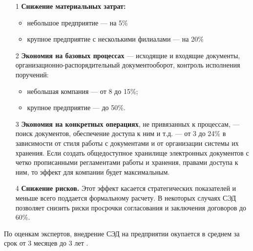 \begin{itemize}
  \item[1] \textbf{Снижение материальных затрат:}
	
	\begin{itemize}
	  \item небольшое предприятие — на 5\%
	  \item крупное предприятие с несколькими филиалами — на 20\%
	\end{itemize}

  \item[2] \textbf{Экономия на базовых процессах} — исходящие и входящие документы, организационно-распорядительный документооборот, контроль исполнения поручений:
	
	\begin{itemize}
	  \item небольшая компания — от 8 до 15\%;
	  \item крупное предприятие — до 50\%.
	\end{itemize}
	
  \item[3] \textbf{Экономия на конкретных операциях}, не привязанных к процессам, — поиск документов, обеспечение доступа к ним и т.д. — от 3 до 24\% в зависимости от стиля работы с документами и от организации системы их хранения. Если создать общедоступное хранилище электронных документов с четко прописанными регламентами работы и хранения, правами доступа к ним, то эффект для компании будет максимальным.

  \item[4] \textbf{Снижение рисков.} Этот эффект касается стратегических показателей и меньше всего поддается формальному расчету. В некоторых случаях СЭД позволяет снизить риски просрочки согласования и заключения договоров до 60\%.

\end{itemize}

По оценкам экспертов, внедрение СЭД на предприятии окупается в среднем за срок от 3 месяцев до 3 лет \cite{ecm_journal}.
